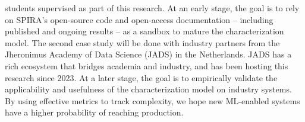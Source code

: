 {students supervised as part of this research. At an early stage, the goal is to
rely on SPIRA's open-source code and open-access documentation -- including
published and ongoing results -- as a sandbox to mature the characterization
model. The second case study will be done with industry partners from the
Jheronimus Academy of Data Science (JADS) in the Netherlands. JADS has a rich
ecosystem that bridges academia and industry, and has been hosting this research
since 2023. At a later stage, the goal is to empirically validate the
applicability and usefulness of the characterization model on industry systems.
By using effective metrics to track complexity, we hope new ML-enabled systems
have a higher probability of reaching production.
}
